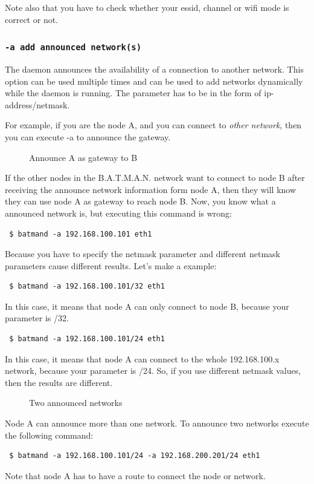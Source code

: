 \documentclass[
	12pt,
	a4paper,
	twoside,
	english,
	headsepline,
	footnosepline,
	automark,
	normalheadings,
	openany,
	cleardoubleplain,
	abstracton,
	idxtotoc,
	liststotoc,
	bibtotoc,
 	BCOR8mm,
]{scrartcl}
\newcommand{\subsubsectionttt}[1]{\subsubsection{\texttt{#1}}}
\begin{document}
Note also that you have to check whether your essid, channel or wifi mode is
correct or not.

\subsubsectionttt{-a add announced network(s)}
The daemon announces the availability of a connection to another network. This
option can be used multiple times and can be used to add networks dynamically
while the daemon is running. The parameter has to be in the form of
ip-address/netmask.

For example, if you are the node A, and you can connect to \emph{other
network}, then you can execute -a to announce the gateway.

\begin{figure}[H]
 \begin{center}
   
  \end{center}
  \caption{Announce A as gateway to B}
\end{figure}

If the other nodes in the B.A.T.M.A.N. network want to connect to node B after
receiving the announce network information form node A, then they will know they
can use node A as gateway to reach node B. Now, you know what a announced
network is, but executing this command is wrong:
\begin{verbatim}
 $ batmand -a 192.168.100.101 eth1
\end{verbatim}

Because you have to specify the netmask parameter and different netmask
parameters cause different results. Let's make a example:
\begin{verbatim}
 $ batmand -a 192.168.100.101/32 eth1
\end{verbatim}
In this case, it means that node A can only connect to node B, because your
parameter is /32.

\begin{verbatim}
 $ batmand -a 192.168.100.101/24 eth1
\end{verbatim}
In this case, it means that node A can connect to the whole 192.168.100.x
network, because your parameter is /24. So, if you use different netmask values,
then the results are different.

\begin{figure}[H]
 \begin{center}
  
 \end{center}
  \caption{Two announced networks}
\end{figure}

Node A can announce more than one network. To announce two networks execute the
following command:
\begin{verbatim}
 $ batmand -a 192.168.100.101/24 -a 192.168.200.201/24 eth1
\end{verbatim}
Note that node A has to have a route to connect the node or network.
\end{document}
